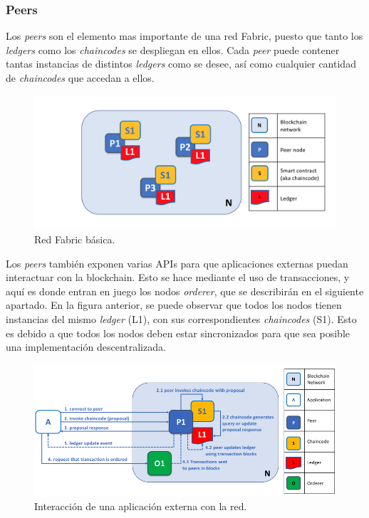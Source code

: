 \subsubsection{Peers}
Los \textit{peers} son el elemento mas importante de una red Fabric, puesto que tanto los \textit{ledgers} como los \textit{chaincodes} se despliegan en ellos. Cada \textit{peer} puede contener tantas instancias de distintos \textit{ledgers} como se desee, así como cualquier cantidad de \textit{chaincodes} que accedan a ellos.
\begin{figure}[H]
\centerline{\includegraphics[scale=0.4]{recursos/peers.png}}
\caption{Red Fabric básica.}
\label{peers-network}
\end{figure}
Los \textit{peers} también exponen varias APIs para que aplicaciones externas puedan interactuar con la blockchain. Esto se hace mediante el uso de transacciones, y aquí es donde entran en juego los nodos \textit{orderer}, que se describirán en el siguiente apartado.
En la figura anterior, se puede observar que todos los nodos tienen instancias del mismo \textit{ledger} (L1), con sus correspondientes \textit{chaincodes} (S1). Esto es debido a que todos los nodos deben estar sincronizados para que sea posible una implementación descentralizada.
\begin{figure}[h]
\centerline{\includegraphics[scale=0.6]{recursos/peers-aplicacion.png}}
\caption{Interacción de una aplicación externa con la red.}
\label{peers-application}
\end{figure}
\clearpage
